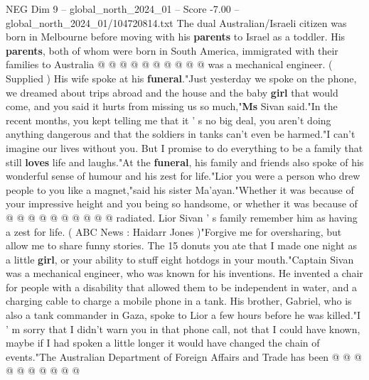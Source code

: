 \begin{textsample}{NEG Dim 9 – global\_north\_2024\_01 – Score -7.00 – global\_north\_2024\_01/104720814.txt}
The dual Australian/Israeli citizen was born in Melbourne before moving with his \textbf{parents} to Israel as a toddler.
His \textbf{parents}, both of whom were born in South America, immigrated with their families to Australia @ @ @ @ @ @ @ @ @ @ was a mechanical engineer. ( Supplied ) His wife spoke at his \textbf{funeral}."Just yesterday we spoke on the phone, we dreamed about trips abroad and the house and the baby \textbf{girl} that would come, and you said it hurts from missing us so much,"\textbf{Ms} Sivan said."In the recent months, you kept telling me that it ' s no big deal, you aren't doing anything dangerous and that the soldiers in tanks can't even be harmed."I can't imagine our lives without you.
But I promise to do everything to be a family that still \textbf{loves} life and laughs."At the \textbf{funeral}, his family and friends also spoke of his wonderful sense of humour and his zest for life."Lior you were a person who drew people to you like a magnet,"said his sister Ma'ayan."Whether it was because of your impressive height and you being so handsome, or whether it was because of @ @ @ @ @ @ @ @ @ @ radiated.
Lior Sivan ' s family remember him as having a zest for life. ( ABC News : Haidarr Jones )"Forgive me for oversharing, but allow me to share funny stories.
The 15 donuts you ate that I made one night as a little \textbf{girl}, or your ability to stuff eight hotdogs in your mouth."Captain Sivan was a mechanical engineer, who was known for his inventions.
He invented a chair for people with a disability that allowed them to be independent in water, and a charging cable to charge a mobile phone in a tank.
His brother, Gabriel, who is also a tank commander in Gaza, spoke to Lior a few hours before he was killed."I ' m sorry that I didn't warn you in that phone call, not that I could have known, maybe if I had spoken a little longer it would have changed the chain of events."The Australian Department of Foreign Affairs and Trade has been @ @ @ @ @ @ @ @ @ @

\end{textsample}
